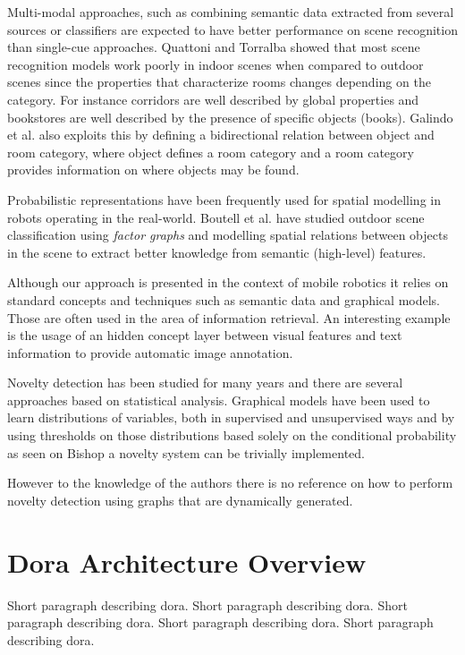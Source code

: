 \documentclass[runningheads,a4paper]{llncs}
\begin{document}
Multi-modal approaches, such as combining semantic data extracted from
several sources or classifiers are expected to have better performance on scene
recognition than single-cue approaches. Quattoni and Torralba\cite{quattoni2009recognizing}
showed that most scene recognition models work poorly in indoor scenes when
compared to outdoor scenes since the properties that
characterize rooms changes depending on the category. For instance corridors are well
described by global properties and bookstores are well described by the presence of
specific objects (books).
Galindo et al.\cite{galindo2005multi} also exploits this by defining a bidirectional relation
between object and room category, where object defines a room category and a room
category provides information on where objects may be found.

Probabilistic representations have been frequently used for spatial modelling
in robots operating in the real-world\cite{gross2009toomas,maier2010probabilistic}.
Boutell et al.\cite{boutell2006factor} have studied outdoor scene classification using
\emph{factor graphs} and modelling spatial relations between objects in the scene
to extract better knowledge from semantic (high-level) features.

Although our approach is presented in the context of mobile robotics it relies on
standard concepts and techniques such as semantic data and graphical models.
Those are often used in the area of information retrieval.
An interesting example is the usage of an hidden concept layer between visual features
and text information to provide automatic image annotation\cite{zhang2006probabilistic}.

Novelty detection has been studied for many years and there are several approaches
based on statistical analysis\cite{markou2003novelty}.
Graphical models have been used to learn distributions of variables, both in
supervised and unsupervised ways and by using thresholds on those distributions
based solely on the conditional probability as seen on Bishop\cite{bishop1994novelty}
a novelty system can be trivially implemented.

However to the knowledge of the authors there is no reference on how to perform
novelty detection using graphs that are dynamically generated.

\section{Dora Architecture Overview}
Short paragraph describing dora. Short paragraph describing dora. Short paragraph describing dora. Short paragraph describing dora. Short paragraph describing dora.
\end{document}

